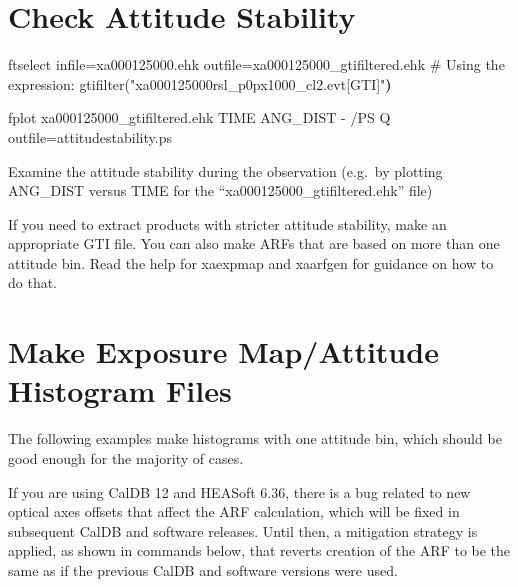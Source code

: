 \documentclass[
  letterpaper,
  DIV=11,
  numbers=noendperiod]{scrreprt}
\newenvironment{Shaded}{\begin{snugshade}}{\end{snugshade}}
\newcommand{\AttributeTok}[1]{\textcolor[rgb]{0.40,0.45,0.13}{#1}}
\newcommand{\CommentTok}[1]{\textcolor[rgb]{0.37,0.37,0.37}{#1}}
\newcommand{\ErrorTok}[1]{\textcolor[rgb]{0.68,0.00,0.00}{#1}}
\newcommand{\ExtensionTok}[1]{\textcolor[rgb]{0.00,0.23,0.31}{#1}}
\newcommand{\KeywordTok}[1]{\textcolor[rgb]{0.00,0.23,0.31}{\textbf{#1}}}
\newcommand{\NormalTok}[1]{\textcolor[rgb]{0.00,0.23,0.31}{#1}}
\newcommand{\StringTok}[1]{\textcolor[rgb]{0.13,0.47,0.30}{#1}}
\begin{document}
\section{Check Attitude Stability}\label{check-attitude-stability}

\begin{Shaded}
\begin{Highlighting}[]
\ExtensionTok{ftselect}\NormalTok{ infile=xa000125000.ehk outfile=xa000125000\_gtifiltered.ehk }
\CommentTok{\# Using the expression:}
\ExtensionTok{gtifilter}\ErrorTok{(}\StringTok{"xa000125000rsl\_p0px1000\_cl2.evt[GTI]"}\KeywordTok{)}

\ExtensionTok{fplot}\NormalTok{ xa000125000\_gtifiltered.ehk TIME ANG\_DIST }\AttributeTok{{-}}\NormalTok{ /PS Q outfile=attitudestability.ps}
\end{Highlighting}
\end{Shaded}

Examine the attitude stability during the observation (e.g.~by plotting
ANG\_DIST versus TIME for the ``xa000125000\_gtifiltered.ehk'' file)

If you need to extract products with stricter attitude stability, make
an appropriate GTI file. You can also make ARFs that are based on more
than one attitude bin. Read the help for xaexpmap and xaarfgen for
guidance on how to do that.

\section{Make Exposure Map/Attitude Histogram
Files}\label{make-exposure-mapattitude-histogram-files}

The following examples make histograms with one attitude bin, which
should be good enough for the majority of cases.

\begin{tcolorbox}[enhanced jigsaw, arc=.35mm, bottomrule=.15mm, bottomtitle=1mm, breakable, colback=white, colbacktitle=quarto-callout-warning-color!10!white, colframe=quarto-callout-warning-color-frame, coltitle=black, left=2mm, leftrule=.75mm, opacityback=0, opacitybacktitle=0.6, rightrule=.15mm, title=\textcolor{quarto-callout-warning-color}{\faExclamationTriangle}\hspace{0.5em}{Mitigation of a bug in CalDB 12 and HEASoft 6.36}, titlerule=0mm, toprule=.15mm, toptitle=1mm]

If you are using CalDB 12 and HEASoft 6.36, there is a bug related to
new optical axes offsets that affect the ARF calculation, which will be
fixed in subsequent CalDB and software releases. Until then, a
mitigation strategy is applied, as shown in commands below, that reverts
creation of the ARF to be the same as if the previous CalDB and software
versions were used.

\end{tcolorbox}
\end{document}
